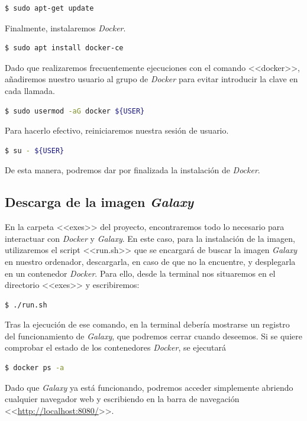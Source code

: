     \begin{lstlisting}[language=bash]
    $ sudo apt-get update
    \end{lstlisting}
Finalmente, instalaremos \textit{Docker}.
    \begin{lstlisting}[language=bash]
    $ sudo apt install docker-ce
    \end{lstlisting}
Dado que realizaremos frecuentemente ejecuciones con el comando <<docker>>, añadiremos nuestro usuario al grupo de \textit{Docker} para evitar introducir la clave en cada llamada.
    \begin{lstlisting}[language=bash]
    $ sudo usermod -aG docker ${USER}
    \end{lstlisting}
Para hacerlo efectivo, reiniciaremos nuestra sesión de usuario.
    \begin{lstlisting}[language=bash]
    $ su - ${USER}
    \end{lstlisting}
De esta manera, podremos dar por finalizada la instalación de \textit{Docker}.
\subsection{Descarga de la imagen \textit{Galaxy}}
En la carpeta <<exes>> del proyecto, encontraremos todo lo necesario para interactuar con \textit{Docker} y \textit{Galaxy}. En este caso, para la instalación de la imagen, utilizaremos el script <<run.sh>> que se encargará de buscar la imagen \textit{Galaxy} en nuestro ordenador, descargarla, en caso de que no la encuentre, y desplegarla en un contenedor \textit{Docker}. Para ello, desde la terminal nos situaremos en el directorio <<exes>> y escribiremos:
    \begin{lstlisting}[language=bash]
    $ ./run.sh
    \end{lstlisting}
Tras la ejecución de ese comando, en la terminal debería mostrarse un registro del funcionamiento de \textit{Galaxy}, que podremos cerrar cuando deseemos. Si se quiere comprobar el estado de los contenedores \textit{Docker}, se ejecutará
\begin{lstlisting}[language=bash]
    $ docker ps -a
\end{lstlisting}
Dado que \textit{Galaxy} ya está funcionando, podremos acceder simplemente abriendo cualquier navegador web y escribiendo en la barra de navegación <<\url{http://localhost:8080/}>>.



